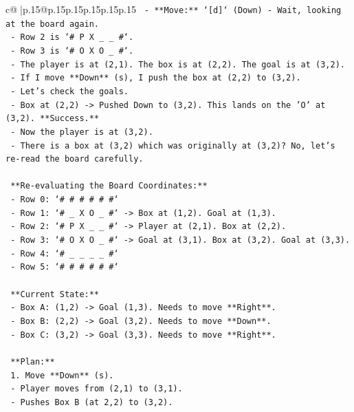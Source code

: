 \documentclass{article}
\begin{document}
{\begin{supertabular}{c@{$\;$}|p{.15\linewidth}@{}p{.15\linewidth}p{.15\linewidth}p{.15\linewidth}p{.15\linewidth}p{.15\linewidth}}
{{{\texttt{    {-} **Move:** `{[}d{]}` (Down) {-} Wait, looking at the board again.} \\
\texttt{    {-} Row 2 is `\# P X \_ \_ \#`.} \\
\texttt{    {-} Row 3 is `\# O X O \_ \#`.} \\
\texttt{    {-} The player is at (2,1). The box is at (2,2). The goal is at (3,2).} \\
\texttt{    {-} If I move **Down** (s), I push the box at (2,2) to (3,2).} \\
\texttt{    {-} Let's check the goals.} \\
\texttt{        {-} Box at (2,2) {-}> Pushed Down to (3,2). This lands on the 'O' at (3,2). **Success.**} \\
\texttt{        {-} Now the player is at (3,2).} \\
\texttt{        {-} There is a box at (3,2) which was originally at (3,2)? No, let's re{-}read the board carefully.} \\
\\ 
\texttt{    **Re{-}evaluating the Board Coordinates:**} \\
\texttt{    {-} Row 0: `\# \# \# \# \# \#`} \\
\texttt{    {-} Row 1: `\# \_ X O \_ \#` {-}> Box at (1,2). Goal at (1,3).} \\
\texttt{    {-} Row 2: `\# P X \_ \_ \#` {-}> Player at (2,1). Box at (2,2).} \\
\texttt{    {-} Row 3: `\# O X O \_ \#` {-}> Goal at (3,1). Box at (3,2). Goal at (3,3).} \\
\texttt{    {-} Row 4: `\# \_ \_ \_ \_ \#`} \\
\texttt{    {-} Row 5: `\# \# \# \# \# \#`} \\
\\ 
\texttt{    **Current State:**} \\
\texttt{    {-} Box A: (1,2) {-}> Goal (1,3). Needs to move **Right**.} \\
\texttt{    {-} Box B: (2,2) {-}> Goal (3,2). Needs to move **Down**.} \\
\texttt{    {-} Box C: (3,2) {-}> Goal (3,3). Needs to move **Right**.} \\
\\ 
\texttt{    **Plan:**} \\
\texttt{    1.  Move **Down** (s).} \\
\texttt{        {-} Player moves from (2,1) to (3,1).} \\
\texttt{        {-} Pushes Box B (at 2,2) to (3,2).} \\
}}}
\end{supertabular}}
\end{document}
